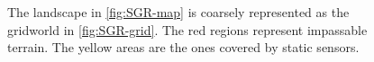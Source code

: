 \begin{figure}
\centering
{}\hspace{1cm}
{}

\caption{The landscape in \ref{fig:SGR-map} is coarsely represented as the gridworld in \ref{fig:SGR-grid}. The red regions represent impassable terrain. The yellow areas are the ones covered  by static sensors.}\vspace{-0.5cm}
\label{fig:casestudy}
\end{figure}

